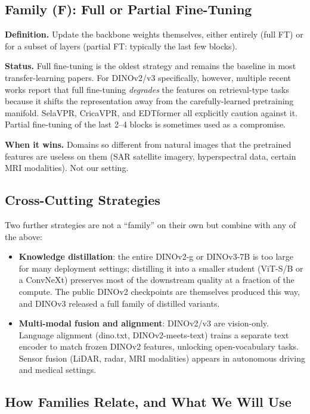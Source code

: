 \documentclass[11pt,a4paper]{article}
\begin{document}
\subsection{Family (F): Full or Partial Fine-Tuning}

\textbf{Definition.} Update the backbone weights themselves, either
entirely (full FT) or for a subset of layers (partial FT: typically the
last few blocks).

\textbf{Status.} Full fine-tuning is the oldest strategy and remains the
baseline in most transfer-learning papers. For DINOv2/v3 specifically,
however, multiple recent works report that full fine-tuning
\emph{degrades} the features on retrieval-type tasks because it shifts
the representation away from the carefully-learned pretraining manifold.
SelaVPR, CricaVPR, and EDTformer all explicitly caution against it.
Partial fine-tuning of the last 2--4 blocks is sometimes used as a
compromise.

\textbf{When it wins.} Domains so different from natural images that the
pretrained features are useless on them (SAR satellite imagery,
hyperspectral data, certain MRI modalities). Not our setting.

\subsection{Cross-Cutting Strategies}

Two further strategies are not a ``family'' on their own but combine with
any of the above:

\begin{itemize}[leftmargin=*]
  \item \textbf{Knowledge distillation}: the entire DINOv2-g or DINOv3-7B
  is too large for many deployment settings; distilling it into a
  smaller student (ViT-S/B or a ConvNeXt) preserves most of the
  downstream quality at a fraction of the compute. The public DINOv2
  checkpoints are themselves produced this way, and DINOv3 released a
  full family of distilled variants.
  \item \textbf{Multi-modal fusion and alignment}: DINOv2/v3 are
  vision-only. Language alignment (dino.txt, DINOv2-meets-text) trains
  a separate text encoder to match frozen DINOv2 features, unlocking
  open-vocabulary tasks. Sensor fusion (LiDAR, radar, MRI modalities)
  appears in autonomous driving and medical settings.
\end{itemize}

\subsection{How Families Relate, and What We Will Use}
\end{document}
